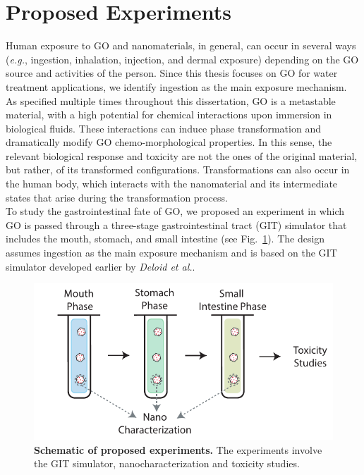 \section{Proposed Experiments}
Human exposure to GO and nanomaterials, in general, can occur in several ways (\textit{e.g.}, ingestion, inhalation, injection, and dermal exposure) depending on the GO source and activities of the person. Since this thesis focuses on GO for water treatment applications, we identify ingestion as the main exposure mechanism.\\
As specified multiple times throughout this dissertation, GO is a metastable material, with a high potential for chemical interactions upon immersion in biological fluids. These interactions can induce phase transformation and dramatically modify GO chemo-morphological properties. In this sense, the relevant biological response and toxicity are not the ones of the original material, but rather, of its transformed configurations.  Transformations can also occur in the human body, which interacts with the nanomaterial and its intermediate states that arise during the transformation process.\cite{wang2016biological}\\
To study the gastrointestinal fate of GO, we proposed an experiment in which GO is passed through a three-stage gastrointestinal tract (GIT) simulator that includes the mouth, stomach, and small intestine (see Fig.~\ref{Fig2_fut}). The design assumes ingestion as the main exposure mechanism and is based on the GIT simulator developed earlier by \textit{Deloid et al.}. \cite{deloid2017integrated}

\begin{figure}[t!]
  \centering
  \includegraphics[width=5in]{future/Fig2.pdf}
  \caption{\textbf{Schematic of proposed experiments.} The experiments involve the GIT simulator, nanocharacterization and  toxicity studies.}
  \label{Fig2_fut}
\end{figure}


